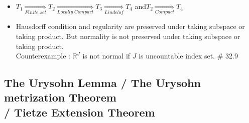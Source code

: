 \documentclass[12pt]{article}
\newcommand{\Real}{\mathbb{R}}
\begin{document}
\begin{itemize}
\begin{itemize}
\begin{enumerate}
		\end{enumerate}
		\item $T_1\underset{Finite\; set}{\Rightarrow}T_2\underset{Locally\; Compact}{\Rightarrow}T_3\underset{Lindelof}{\Rightarrow}T_4$ \quad and\quad $T_2\underset{Compact}{\Rightarrow}T_4$
		\item Hausdorff condition and regularity are preserved under taking subspace or taking product. But normality is not preserved under taking subspace or taking product.
		\\ Counterexample : $\Real^J$ is not normal if $J$ is uncountable index set. \quad \# 32.9
	\end{itemize} 
\end{itemize}
\bigskip

\subsection{The Urysohn Lemma / The Urysohn metrization Theorem \\ / Tietze Extension Theorem}
\smallskip
\end{document}
